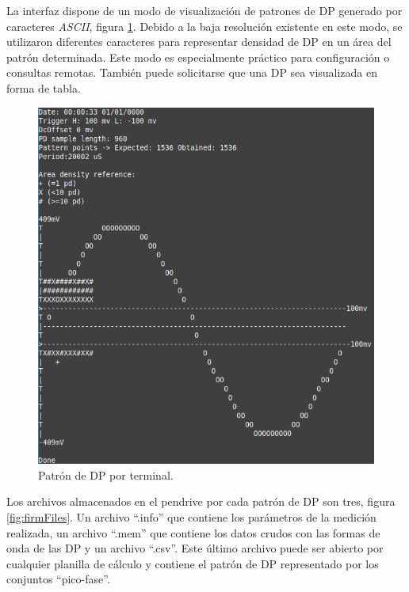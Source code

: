 \vspace{5mm}

La interfaz dispone de un modo de visualización de patrones de DP generado por caracteres \textit{ASCII}, figura \ref{fig:firmInterfaz}. Debido a la baja resolución existente en este modo, se utilizaron diferentes caracteres para representar densidad de DP en un área del patrón determinada. Este modo es especialmente práctico para configuración o consultas remotas. También puede solicitarse que una DP sea visualizada en forma de tabla.

\vspace{5mm}

\begin{figure}[ht]
	\centering
	\includegraphics[width=130mm]{./Figures/firmInterfaz.png}
	\caption{Patrón de DP por terminal.}
	\label{fig:firmInterfaz}
\end{figure}

Los archivos almacenados en el pendrive por cada patrón de DP son tres, figura \ref{fig:firmFiles}. Un archivo \enquote{.info} que contiene los parámetros de la medición realizada, un archivo \enquote{.mem} que contiene los datos crudos con las formas de onda de las DP y un archivo \enquote{.csv}. Este último archivo puede ser abierto por cualquier planilla de cálculo y contiene el patrón de DP representado por los conjuntos \enquote{pico-fase}.

